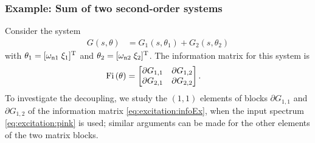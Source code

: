 \subsubsection{Example: Sum of two second-order systems}
\label{sec:excitation:ex:sumOfSecondOrderSipmle}
Consider the system
\begin{align}
G(s,\theta) &= G_1(s,\theta_1) + G_2(s,\theta_2)%
\end{align}
with $\theta_1=[\wn[1]\;\damping[1]]^{\T}$ and $\theta_2=[\wn[2]\;\damping[2]]^{\T}$.
The information matrix for this system is
\begin{align}
\Fi{\theta} &=
       \begin{bmatrix}
         \partial G_{1,1}  & \partial G_{1,2}\\
         \partial G_{2,1}  & \partial G_{2,2}
       \end{bmatrix}.
\label{eq:excitation:infoEx}
\end{align}
To investigate the decoupling, we study the $(1,1)$ elements of blocks $\partial G_{1,1}$ and $\partial G_{1,2}$ of the information matrix \eqref{eq:excitation:infoEx}, when the input spectrum \eqref{eq:excitation:pink} is used; similar arguments can be made for the other elements of the two matrix blocks.

